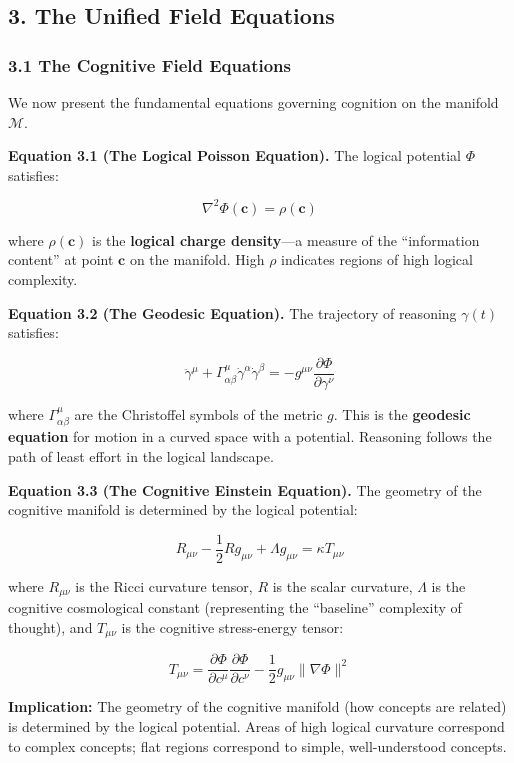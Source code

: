 \documentclass[
  11pt,
  a4paper,
]{article}
\begin{document}
\subsection{3. The Unified Field
Equations}\label{the-unified-field-equations}

\subsubsection{3.1 The Cognitive Field
Equations}\label{the-cognitive-field-equations}

We now present the fundamental equations governing cognition on the
manifold \(\mathcal{M}\).

\textbf{Equation 3.1 (The Logical Poisson Equation).} The logical
potential \(\Phi\) satisfies:

\[\nabla^2 \Phi(\mathbf{c}) = \rho(\mathbf{c})\]

where \(\rho(\mathbf{c})\) is the \textbf{logical charge density}---a
measure of the ``information content'' at point \(\mathbf{c}\) on the
manifold. High \(\rho\) indicates regions of high logical complexity.

\textbf{Equation 3.2 (The Geodesic Equation).} The trajectory of
reasoning \(\gamma(t)\) satisfies:

\[\ddot{\gamma}^\mu + \Gamma^\mu_{\alpha\beta} \dot{\gamma}^\alpha \dot{\gamma}^\beta = -g^{\mu\nu} \frac{\partial \Phi}{\partial \gamma^\nu}\]

where \(\Gamma^\mu_{\alpha\beta}\) are the Christoffel symbols of the
metric \(g\). This is the \textbf{geodesic equation} for motion in a
curved space with a potential. Reasoning follows the path of least
effort in the logical landscape.

\textbf{Equation 3.3 (The Cognitive Einstein Equation).} The geometry of
the cognitive manifold is determined by the logical potential:

\[R_{\mu\nu} - \frac{1}{2} R g_{\mu\nu} + \Lambda g_{\mu\nu} = \kappa T_{\mu\nu}\]

where \(R_{\mu\nu}\) is the Ricci curvature tensor, \(R\) is the scalar
curvature, \(\Lambda\) is the cognitive cosmological constant
(representing the ``baseline'' complexity of thought), and
\(T_{\mu\nu}\) is the cognitive stress-energy tensor:

\[T_{\mu\nu} = \frac{\partial \Phi}{\partial c^\mu} \frac{\partial \Phi}{\partial c^\nu} - \frac{1}{2} g_{\mu\nu} \| \nabla \Phi \|^2\]

\textbf{Implication:} The geometry of the cognitive manifold (how
concepts are related) is determined by the logical potential. Areas of
high logical curvature correspond to complex concepts; flat regions
correspond to simple, well-understood concepts.
\end{document}
